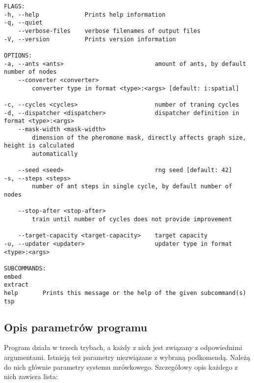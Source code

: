 {{\begin{lstlisting}[basicstyle=\tiny, caption=Pomoc programu, label=code:help]
FLAGS:
-h, --help             Prints help information
-q, --quiet
    --verbose-files    verbose filenames of output files
-V, --version          Prints version information

OPTIONS:
-a, --ants <ants>                          amount of ants, by default number of nodes
    --converter <converter>
        converter type in format <type>:<args> [default: i:spatial]

-c, --cycles <cycles>                      number of traning cycles
-d, --dispatcher <dispatcher>              dispatcher definition in format <type>:<args>
    --mask-width <mask-width>
        dimension of the pheromone mask, directly affects graph size, height is calculated
        automatically

    --seed <seed>                          rng seed [default: 42]
-s, --steps <steps>
        number of ant steps in single cycle, by default number of nodes

    --stop-after <stop-after>
        train until number of cycles does not provide improvement

    --target-capacity <target-capacity>    target capacity
-u, --updater <updater>                    updater type in format <type>:<args>

SUBCOMMANDS:
embed
extract
help       Prints this message or the help of the given subcommand(s)
tsp
        \end{lstlisting}

        \subsection{Opis parametrów programu}
        {
            Program działa w trzech trybach, a każdy z nich jest związany z odpowiednimi argumentami. Istnieją też
            parametry niezwiązane z wybraną podkomendą. Należą do nich głównie parametry systemu mrówkowego.
            Szczegółowy opis każdego z nich zawiera lista:

}}}
